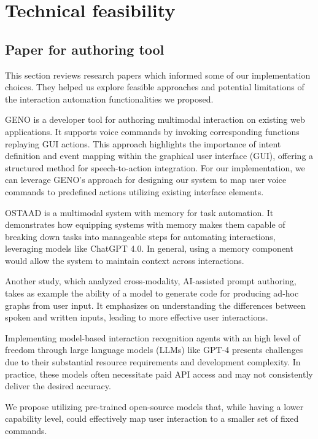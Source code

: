 \documentclass{article}
\begin{document}
\section{Technical feasibility}

\subsection{Paper for authoring tool}

This section reviews research papers which informed some of our implementation choices.
They helped us explore feasible approaches and potential limitations of the interaction automation functionalities we proposed.

GENO is a developer tool for authoring multimodal interaction on existing web applications.
It supports voice commands by invoking corresponding functions replaying GUI actions.
This approach highlights the importance of intent definition and event mapping within the graphical user interface (GUI), offering a structured method for speech-to-action integration.
For our implementation, we can leverage GENO’s approach for designing our system to map user voice commands to predefined actions utilizing existing interface elements.

OSTAAD is a multimodal system with memory for task automation.
It demonstrates how equipping systems with memory makes them capable of breaking down tasks into manageable steps for automating interactions, leveraging models like ChatGPT 4.0.
In general, using a memory component would allow the system to maintain context across interactions.

Another study, which analyzed cross-modality, AI-assisted prompt authoring, takes as example the ability of a model to generate code for producing ad-hoc graphs from user input.
It emphasizes on understanding the differences between spoken and written inputs, leading to more effective user interactions.

Implementing model-based interaction recognition agents with an high level of freedom through large language models (LLMs) like GPT-4 presents challenges due to their substantial resource requirements and development complexity.
In practice, these models often necessitate paid API access and may not consistently deliver the desired accuracy.

We propose utilizing pre-trained open-source models that, while having a lower capability level, could effectively map user interaction to a smaller set of fixed commands.
\end{document}
